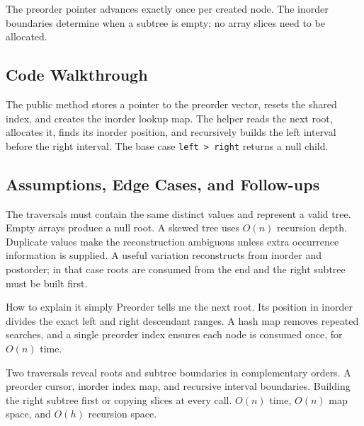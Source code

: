 The preorder pointer advances exactly once per created node. The inorder
boundaries determine when a subtree is empty; no array slices need to be
allocated.

\subsection{Code Walkthrough}
The public method stores a pointer to the preorder vector, resets the shared
index, and creates the inorder lookup map. The helper reads the next root,
allocates it, finds its inorder position, and recursively builds the left
interval before the right interval. The base case \texttt{left > right}
returns a null child.

\subsection{Assumptions, Edge Cases, and Follow-ups}
The traversals must contain the same distinct values and represent a valid
tree. Empty arrays produce a null root. A skewed tree uses \(O(n)\) recursion
depth. Duplicate values make the reconstruction ambiguous unless extra
occurrence information is supplied. A useful variation reconstructs from
inorder and postorder; in that case roots are consumed from the end and the
right subtree must be built first.

\begin{revisionbox}{How to explain it simply}
Preorder tells me the next root. Its position in inorder divides the exact
left and right descendant ranges. A hash map removes repeated searches, and a
single preorder index ensures each node is consumed once, for \(O(n)\) time.
\end{revisionbox}
\chaptercheckpoint
  {Two traversals reveal roots and subtree boundaries in complementary orders.}
  {A preorder cursor, inorder index map, and recursive interval boundaries.}
  {Building the right subtree first or copying slices at every call.}
  {$O(n)$ time, $O(n)$ map space, and $O(h)$ recursion space.}